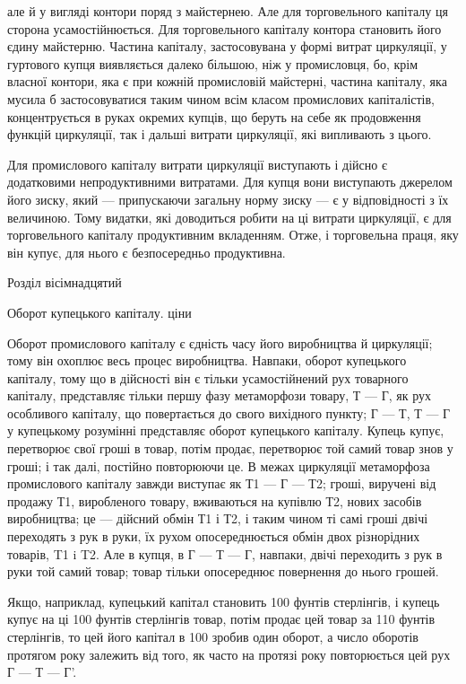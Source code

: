 \parcont{}  %
але й у вигляді контори поряд з майстернею. Але для торговельного
капіталу ця сторона усамостійнюється. Для торговельного
капіталу контора становить його єдину майстерню. Частина
капіталу, застосовувана у формі витрат циркуляції, у гуртового
купця виявляється далеко більшою, ніж у промисловця, бо, крім
власної контори, яка є при кожній промисловій майстерні, частина
капіталу, яка мусила б застосовуватися таким чином всім
класом промислових капіталістів, концентрується в руках окремих
купців, що беруть на себе як продовження функцій циркуляції,
так і дальші витрати циркуляції, які випливають з цього.

Для промислового капіталу витрати циркуляції виступають
і дійсно є додатковими непродуктивними витратами. Для купця
вони виступають джерелом його зиску, який — припускаючи загальну
норму зиску — є у відповідності з їх величиною. Тому
видатки, які доводиться робити на ці витрати циркуляції, є для
торговельного капіталу продуктивним вкладенням. Отже, і торговельна
праця, яку він купує, для нього є безпосередньо
продуктивна.

Розділ вісімнадцятий

Оборот купецького капіталу. ціни

Оборот промислового капіталу є єдність часу його виробництва
й циркуляції; тому він охоплює весь процес виробництва.
Навпаки, оборот купецького капіталу, тому що в дійсності
він є тільки усамостійнений рух товарного капіталу, представляє
тільки першу фазу метаморфози товару, Т — Г, як рух
особливого капіталу, що повертається до свого вихідного пункту;
Г — Т, Т — Г у купецькому розумінні представляє оборот купецького
капіталу. Купець купує, перетворює свої гроші в товар, потім
продає, перетворює той самий товар знов у гроші; і так далі,
постійно повторюючи це. В межах циркуляції метаморфоза промислового
капіталу завжди виступає як Т1 — Г — Т2; гроші, виручені
від продажу Т1, виробленого товару, вживаються на
купівлю Т2, нових засобів виробництва; це — дійсний обмін Т1
і Т2, і таким чином ті самі гроші двічі переходять з рук в руки,
їх рухом опосереднюється обмін двох різнорідних товарів, T1 i T2.
Але в купця, в Г — Т — Г, навпаки, двічі переходить з рук
в руки той самий товар; товар тільки опосереднює повернення
до нього грошей.

Якщо, наприклад, купецький капітал становить 100 фунтів
стерлінгів, і купець купує на ці 100 фунтів стерлінгів товар,
потім продає цей товар за 110 фунтів стерлінгів, то цей його
капітал в 100 зробив один оборот, а число оборотів протягом
року залежить від того, як часто на протязі року повторюється
цей рух Г — Т — Г'.

